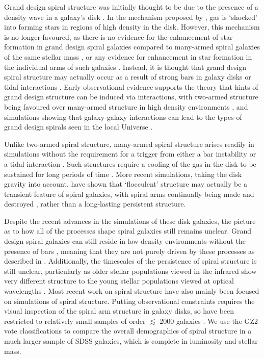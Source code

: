 \documentclass[useAMS,usenatbib]{mn2e}
\begin{document}
Grand design spiral structure was initially thought to be due to the presence of a density wave in a galaxy's disk \citep{Lindblad_63,Lin_64}. In the mechanism proposed by \citet{Lin_64}, gas is `shocked' into forming stars in regions of high density in the disk. However, this mechanism is no longer favoured, as there is no evidence for the enhancement of star formation in grand design spiral galaxies compared to many-armed spiral galaxies of the same stellar mass \citep{Romanishin_85,EE_86,Kendall_15}, or any evidence for enhancement in star formation in the individual arms of such galaxies \citep{Foyle_11,Choi_15}. Instead, it is thought that grand design spiral structure may actually occur as a result of strong bars in galaxy disks or tidal interactions \citep{Kormendy_79}. Early observational evidence supports the theory that hints of grand design structure can be induced via interactions, with two-armed structure being favoured over many-armed structure in high density environments \citep{EE_82,EE_87,Ann_14}, and simulations showing that galaxy-galaxy interactions can lead to the types of grand design spirals seen in the local Universe \citep{Dobbs_10,Semczuk_15}. 

Unlike two-armed spiral structure, many-armed spiral structure arises readily in simulations without the requirement for a trigger from either a bar instability or a tidal interaction \citep{James_78,Sellwood_84}. Such structures require a cooling of the gas in the disk to be sustained for long periods of time \citep{Carlberg_85}. More recent simulations, taking the disk gravity into account, have shown that `flocculent' structure may actually be a transient feature of spiral galaxies, with spiral arms continually being made and destroyed \citep{Bottema_03,Grand_12b,Baba_09,Baba_13,Donghia_13}, rather than a long-lasting persistent structure.

Despite the recent advances in the simulations of these disk galaxies, the picture as to how all of the processes shape spiral galaxies still remains unclear. Grand design spiral galaxies can still reside in low density environments without the presence of bars \citep{EE_82}, meaning that they are not purely driven by these processes as described in \citet{Kormendy_79}. Additionally, the timescales of the persistence of spiral structure is still unclear, particularly as older stellar populations viewed in the infrared show very different structure to the young stellar populations viewed at optical wavelengths \citep{Block_91,Block_94,Thornley_96}. Most recent work on spiral structure have also mainly been focused on simulations of spiral structure. Putting observational constraints requires the visual inspection of the spiral arm structure in galaxy disks, so have been restricted to relatively small samples of order $\lesssim$ 2000 galaxies \citep{EE_82,EE_89,Ann_13}. We use the GZ2 vote classifications to compare the overall demographics of spiral structure in a much larger sample of SDSS galaxies, which is complete in luminosity and stellar mass.
\end{document}

